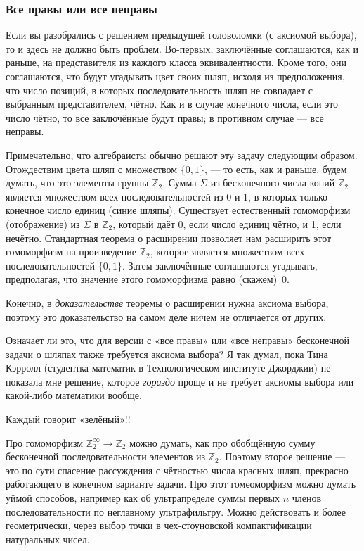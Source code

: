\subsubsection*{Все правы или все неправы}

Если вы разобрались с решением предыдущей головоломки (с аксиомой выбора), то и здесь не должно быть проблем.
Во-первых, заключённые соглашаются, как и раньше, на представителя из каждого класса эквивалентности.
Кроме того, они соглашаются, что будут угадывать цвет своих шляп, исходя из предположения, что число позиций, в которых последовательность шляп не совпадает с выбранным представителем, чётно.
Как и в случае конечного числа, если это число чётно, то все заключённые будут правы; в противном случае --- все неправы.

Примечательно, что алгебраисты обычно решают эту задачу следующим образом.
Отождествим цвета шляп с множеством $\{0, 1\}$, --- то есть, как и раньше, 
будем думать, что это элементы группы $\mathbb{Z}_2$.
Сумма $\Sigma$ из бесконечного числа копий $\mathbb{Z}_2$ является множеством всех последовательностей из 0 и 1, в которых только конечное число единиц (синие шляпы).
Существует естественный гомоморфизм (отображение) из $\Sigma$ в $\mathbb{Z}_2$, который даёт 0, если число единиц чётно, и 1, если нечётно.
Стандартная теорема о расширении позволяет нам расширить этот гомоморфизм на произведение $\mathbb{Z}_2$, которое является множеством всех последовательностей $\{0, 1\}$.
Затем заключённые соглашаются угадывать, предполагая, что значение этого гомоморфизма равно (скажем)~0.

Конечно, в \emph{доказательстве} теоремы о расширении нужна аксиома выбора, поэтому это доказательство на самом деле ничем не отличается от других.

Означает ли это, что для версии с «все правы» или «все неправы» бесконечной задачи о шляпах также требуется аксиома выбора?
Я так думал, пока Тина Кэрролл (студентка-математик в Технологическом институте Джорджии) не показала мне решение, которое \emph{гораздо} проще и не требует аксиомы выбора или какой-либо математики вообще.

Каждый говорит «зелёный»!!

\begin{addedbytheeditors}
Про гомоморфизм $\mathbb{Z}_2^\infty\to \mathbb{Z}_2$ можно думать, как про обобщённую сумму бесконечной последовательности элементов из $\mathbb{Z}_2$.
Поэтому второе решение --- это по сути спасение рассуждения с чётностью числа красных шляп, прекрасно работающего в конечном варианте задачи.
Про этот гомеоморфизм можно думать уймой способов, например как об ультрапределе суммы первых $n$ членов последовательности по неглавному ультрафильтру.
Можно действовать и более геометрически, через выбор точки в чех-стоуновской компактификации натуральных чисел.\pr
\end{addedbytheeditors}


